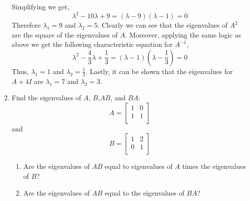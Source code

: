 \begin{enumerate}[label=\arabic*.]
\begin{mdframed}[style=MyFrame]
\begin{equation}
            \end{equation}
            Simplifying we get,
            \begin{equation}
                \lambda^{2} - 10\lambda + 9 = 
                \left(\lambda -9\right)\left(\lambda - 1\right) = 0
            \end{equation}
            Therefore $\lambda_{1} = 9$ and  $\lambda_{2} = 5$. Clearly we
            can see that the eigenvalues of $A^{2}$ are the square of the
            eigenvalues of $A$.  Moreover, applying the same logic as above
            we get the following characteristic equation for $A^{-1}$,
            \begin{equation}
                \lambda^{2} -\frac{4}{3} \lambda + \frac{1}{3} =
                \left(\lambda -1\right)\left(\lambda - \frac{1}{3}\right)
                = 0
            \end{equation}
            Thus, $\lambda_{1} = 1$ and $\lambda_{2} = \frac{1}{3}$.
            Lastly, it can be shown that the eigenvalues for $A+4I$ are
            $\lambda_{1} = 7$ and $\lambda_{2} = 3$. 
        \end{mdframed}
    \item Find the eigenvalues of $A$, $B$,$AB$, and $BA$:
        \begin{equation}
            A = 
            \begin{bmatrix}
                1  & 0 \\
                1  & 1 \\
            \end{bmatrix}
        \end{equation}
        and 
        \begin{equation}
            B = 
            \begin{bmatrix}
                1   & 2 \\
                0  & 1  \\
            \end{bmatrix}
        \end{equation}
        \begin{enumerate}[label=(\alph*)]
            \item Are the eigenvalues of $AB$ equal to eigenvalues of
                $A$ times the eigenvalues of $B$?
            \item Are the eigenvalues of $AB$ equal to the eigenvalues
                of $BA$?
        \end{enumerate}
        \begin{mdframed}[style=MyFrame]

\end{mdframed}
\end{enumerate}
